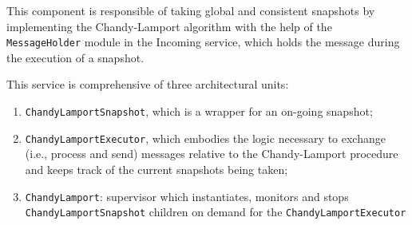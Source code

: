 This component is responsible of taking global and consistent snapshots by
implementing the Chandy-Lamport algorithm with the help of the
\texttt{MessageHolder} module in the Incoming service, which holds the message
during the execution of a snapshot.

This service is comprehensive of three architectural units:

\begin{enumerate}
  \item \texttt{ChandyLamportSnapshot}, which is a wrapper for an on-going
        snapshot;
  \item \texttt{ChandyLamportExecutor}, which embodies the logic necessary to
        exchange (i.e., process and send) messages relative to the
        Chandy-Lamport procedure and keeps track of the current snapshots being
        taken;
  \item \texttt{ChandyLamport}: supervisor which instantiates, monitors and
        stops \texttt{ChandyLamportSnapshot} children on demand for the
        \texttt{ChandyLamportExecutor}
\end{enumerate}
